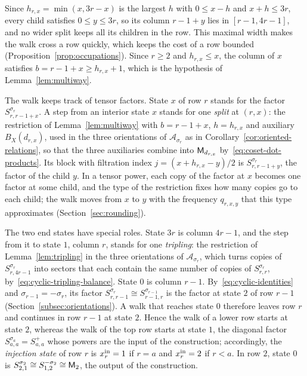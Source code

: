 Since \(h_{r,x}=\min(x,3r-x)\) is the largest \(h\) with \(0\le x-h\) and
\(x+h\le3r\), every child satisfies \(0\le y\le3r\), so its column
\(r-1+y\) lies in \([r-1,4r-1]\), and no wider split keeps all its
children in the row. This maximal width makes the walk cross a row
quickly, which keeps the cost of a row bounded
(Proposition~\ref{prop:occupations}). Since \(r\ge2\) and
\(h_{r,x}\le x\), the column of \(x\) satisfies
\(b=r-1+x\ge h_{r,x}+1\), which is the hypothesis of
Lemma~\ref{lem:multiway}.

The walk keeps track of tensor factors. State \(x\) of row \(r\) stands
for the factor \(S^{\sigma_r}_{r,r-1+x}\). A step from an interior state
\(x\) stands for one \emph{split} at \((r,x)\): the restriction of
Lemma~\ref{lem:multiway} with \(b=r-1+x\), \(h=h_{r,x}\) and auxiliary
\(B_X(d_{r,x})\), used in the three orientations of
\(\mathcal A_{\sigma_r}\) as in Corollary~\ref{cor:oriented-relations},
so that the three auxiliaries combine into \(\mathsf M_{d_{r,x}}\)
by~\eqref{eq:coset-dot-products}. Its block with filtration index
\(j=(x+h_{r,x}-y)/2\) is \(S^{\sigma_r}_{r,r-1+y}\), the factor of the
child \(y\). In a tensor power, each copy of the factor at \(x\) becomes
one factor at some child, and the type of the restriction fixes how many
copies go to each child; the walk moves from \(x\) to \(y\) with the
frequency \(q_{r,x,y}\) that this type approximates
(Section~\ref{sec:rounding}).

The two end states have special roles. State \(3r\) is column \(4r-1\),
and the step from it to state \(1\), column \(r\), stands for one
\emph{tripling}: the restriction of Lemma~\ref{lem:tripling} in the three
orientations of \(\mathcal A_{\sigma_r}\), which turns copies of
\(S^{\sigma_r}_{r,4r-1}\) into sectors that each contain the same number
of copies of \(S^{\sigma_r}_{r,r}\), by~\eqref{eq:cyclic-tripling-balance}.
State \(0\) is column \(r-1\). By~\eqref{eq:cyclic-identities} and
\(\sigma_{r-1}=-\sigma_r\), its factor
\(S^{\sigma_r}_{r,r-1}\cong S^{\sigma_{r-1}}_{r-1,r}\) is the factor at
state \(2\) of row \(r-1\) (Section~\ref{subsec:orientations}). A walk
that reaches state \(0\) therefore leaves row \(r\) and continues in row
\(r-1\) at state \(2\). Hence the walk of a lower row starts at state
\(2\), whereas the walk of the top row starts at state \(1\), the diagonal
factor \(S^{\sigma_a}_{a,a}=S^+_{a,a}\) whose powers are the input of the
construction; accordingly, the \emph{injection state} of row \(r\) is
\(x^{\mathrm{in}}_r=1\) if \(r=a\) and \(x^{\mathrm{in}}_r=2\) if \(r<a\). In row \(2\), state
\(0\) is
\(S^{\sigma_2}_{2,1}\cong S^{-\sigma_2}_{1,2}\cong\mathsf M_2\), the output of
the construction.

